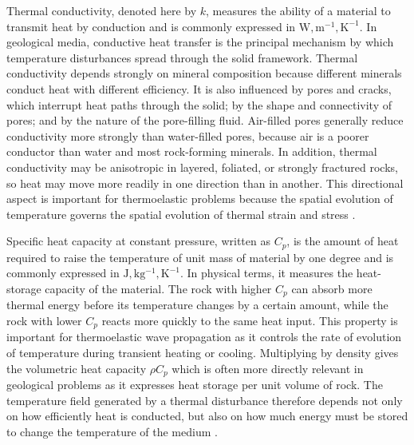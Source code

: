 Thermal conductivity, denoted here by $k$, measures the ability of a material to transmit heat by conduction and is commonly expressed in $\mathrm{W,m^{-1},K^{-1}}$. In geological media, conductive heat transfer is the principal mechanism by which temperature disturbances spread through the solid framework. Thermal conductivity depends strongly on mineral composition because different minerals conduct heat with different efficiency. It is also influenced by pores and cracks, which interrupt heat paths through the solid; by the shape and connectivity of pores; and by the nature of the pore-filling fluid. Air-filled pores generally reduce conductivity more strongly than water-filled pores, because air is a poorer conductor than water and most rock-forming minerals. In addition, thermal conductivity may be anisotropic in layered, foliated, or strongly fractured rocks, so heat may move more readily in one direction than in another. This directional aspect is important for thermoelastic problems because the spatial evolution of temperature governs the spatial evolution of thermal strain and stress \cite{robertson1988,turcotte2014}. %

Specific heat capacity at constant pressure, written as $C_p$, is the amount of heat required to raise the temperature of unit mass of material by one degree and is commonly expressed in $\mathrm{J,kg^{-1},K^{-1}}$. In physical terms, it measures the heat-storage capacity of the material. The rock with higher $C_p$ can absorb more thermal energy before its temperature changes by a certain amount, while the rock with lower $C_p$ reacts more quickly to the same heat input. This property is important for thermoelastic wave propagation as it controls the rate of evolution of temperature during transient heating or cooling. Multiplying by density gives the volumetric heat capacity $\rho C_p$ which is often more directly relevant in geological problems as it expresses heat storage per unit volume of rock. The temperature field generated by a thermal disturbance therefore depends not only on how efficiently heat is conducted, but also on how much energy must be stored to change the temperature of the medium \cite{robertson1988,turcotte2014}. %

